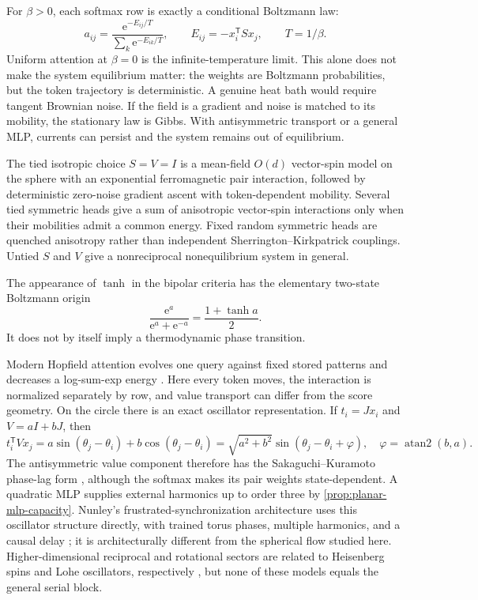 \documentclass[11pt,a4paper]{article}
\theoremstyle{definition}
\newcommand{\T}{\mathsf T}
\newcommand{\e}{\mathrm e}
\begin{document}
For $\beta>0$, each softmax row is exactly a conditional Boltzmann law:
\[
 a_{ij}=\frac{\e^{-E_{ij}/T}}{\sum_k\e^{-E_{ik}/T}},
 \qquad E_{ij}=-x_i^{\T}Sx_j,\qquad T=1/\beta.
\]
Uniform attention at $\beta=0$ is the infinite-temperature limit.
This alone does not make the system equilibrium matter: the weights are Boltzmann
probabilities, but the token trajectory is deterministic. A genuine heat bath would
require tangent Brownian noise. If the field is a gradient and noise is matched to its
mobility, the stationary law is Gibbs. With antisymmetric transport or a general MLP,
currents can persist and the system remains out of equilibrium.

The tied isotropic choice $S=V=I$ is a mean-field $O(d)$ vector-spin model on the sphere with an
exponential ferromagnetic pair interaction, followed by deterministic zero-noise
gradient ascent with token-dependent mobility.  Several tied symmetric heads give a
sum of anisotropic vector-spin interactions only when their mobilities admit a common
energy.  Fixed random symmetric heads are quenched anisotropy rather than independent
Sherrington--Kirkpatrick couplings.  Untied $S$ and $V$ give a nonreciprocal
nonequilibrium system in general.

The appearance of $\tanh$ in the bipolar criteria has the elementary two-state
Boltzmann origin
\[
 \frac{\e^a}{\e^a+\e^{-a}}=\frac{1+\tanh a}{2}.
\]
It does not by itself imply a thermodynamic phase transition.

Modern Hopfield attention evolves one query against fixed stored patterns and
decreases a log-sum-exp energy \cite{ramsauer2021hopfield}.  Here every token moves,
the interaction is normalized separately by row, and value transport can differ from
the score geometry.  On the circle there is an exact oscillator representation.  If
$t_i=Jx_i$ and $V=aI+bJ$, then
\begin{equation}
 t_i^{\T}Vx_j
 =a\sin(\theta_j-\theta_i)+b\cos(\theta_j-\theta_i)
 =\sqrt{a^2+b^2}\sin(\theta_j-\theta_i+\varphi),
 \quad \varphi=\operatorname{atan2}(b,a).
 \label{eq:sakaguchi}
\end{equation}
The antisymmetric value component therefore has the Sakaguchi--Kuramoto phase-lag
form \cite{sakaguchi1986active}, although the softmax makes its pair weights
state-dependent.  A quadratic MLP supplies external harmonics up to order three by
\cref{prop:planar-mlp-capacity}.  Nunley's frustrated-synchronization architecture
uses this oscillator structure directly, with trained torus phases, multiple
harmonics, and a causal delay \cite{nunley2026frustrated}; it is architecturally
different from the spherical flow studied here.  Higher-dimensional reciprocal and
rotational sectors are related to Heisenberg spins and Lohe oscillators, respectively
\cite{lohe2009nonabelian}, but none of these models equals the general serial block.
\end{document}

